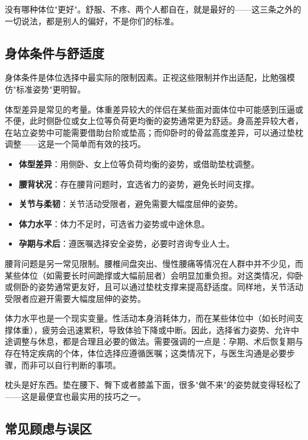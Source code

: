 \documentclass[12pt,UTF8]{ctexbook}
\newcommand{\keyword}[1]{\textbf{#1}}
\begin{document}
\begin{tcolorbox}[colback=pink!5!white,colframe=red!50!black,title=贴心小叮咛]
	没有哪种体位"更好"。舒服、不疼、两个人都自在，就是最好的——这三条之外的一切说法，都是别人的偏好，不是你们的标准。
\end{tcolorbox}
\subsection{身体条件与舒适度}

身体条件是体位选择中最实际的限制因素。正视这些限制并作出适配，比勉强模仿"标准姿势"更明智。

体型差异是常见的考量。体重差异较大的伴侣在某些面对面体位中可能感到压逼或不便，此时侧卧位或女上位等负荷更均衡的姿势通常更为舒适。身高差异较大者，在站立姿势中可能需要借助台阶或垫高；而仰卧时的骨盆高度差异，可以通过垫枕调整——这是一个简单而有效的技巧。

\begin{itemize}
	\item \keyword{体型差异}：用侧卧、女上位等负荷均衡的姿势，或借助垫枕调整。
	\item \keyword{腰背状况}：存在腰背问题时，宜选省力的姿势，避免长时间支撑。
	\item \keyword{关节与柔韧}：关节活动受限者，避免需要大幅度屈伸的姿势。
	\item \keyword{体力水平}：体力不足时，可选省力姿势或中途休息。
	\item \keyword{孕期与术后}：遵医嘱选择安全姿势，必要时咨询专业人士。
\end{itemize}

腰背问题是另一常见限制。腰椎间盘突出、慢性腰痛等情况在人群中并不少见，而某些体位（如需要长时间跪撑或大幅前屈者）会明显加重负担。对这类情况，仰卧或侧卧的姿势通常更友好，且可以通过垫枕支撑来提高舒适度。同样地，关节活动受限者应避开需要大幅度屈伸的姿势。

体力水平也是一个现实变量。性活动本身消耗体力，而在某些体位中（如长时间支撑体重），疲劳会迅速累积，导致体验下降或中断。因此，选择省力姿势、允许中途调整与休息，都是合理且必要的做法。需要强调的一点是：孕期、术后恢复期与存在特定疾病的个体，体位选择应遵循医嘱；这类情况下，与医生沟通是必要步骤，而非可以自行判断的事项。

\begin{tcolorbox}[colback=pink!5!white,colframe=red!50!black,title=贴心小叮咛]
	枕头是好东西。垫在腰下、臀下或者膝盖下面，很多"做不来"的姿势就变得轻松了——这是最便宜也最实用的技巧之一。
\end{tcolorbox}
\subsection{常见顾虑与误区}
\end{document}
